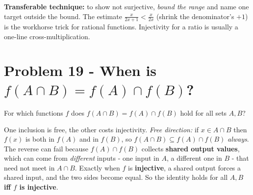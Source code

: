 \documentclass[11pt,a4paper]{article}
\begin{document}
\begin{center}
\end{center}

\begin{methodbox}
\textbf{Transferable technique:} to show \textquotedbl{}not surjective,\textquotedbl{} \emph{bound
the range} and name one target outside the bound. The estimate $\tfrac{x}{2x+1}<\tfrac{x}{2x}$
(shrink the denominator's $+1$) is the workhorse trick for rational functions. Injectivity for a
ratio is usually a one-line cross-multiplication.
\end{methodbox}

\section*{Problem 19 - When is $f(A\cap B)=f(A)\cap f(B)$?}

\begin{problembox}[19]
For which functions $f$ does $f(A\cap B)=f(A)\cap f(B)$ hold for all sets $A,B$?
\end{problembox}

\begin{ideabox}
One inclusion is free, the other costs injectivity. \emph{Free direction:} if $x\in A\cap B$ then
$f(x)$ is both in $f(A)$ and in $f(B)$, so $f(A\cap B)\subseteq f(A)\cap f(B)$ \emph{always}. The
reverse can fail because $f(A)\cap f(B)$ collects \textbf{shared output values}, which can come
from \emph{different} inputs - one input in $A$, a different one in $B$ - that need not meet in
$A\cap B$. Exactly when $f$ is \textbf{injective}, a shared output forces a shared input, and the
two sides become equal. So the identity holds for all $A,B$ \textbf{iff $f$ is injective}.
\end{ideabox}
\end{document}
